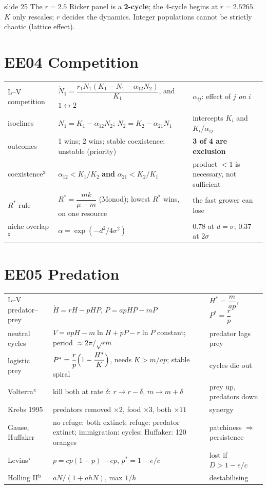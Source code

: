 \documentclass[9pt]{article}
\begin{document}
\begin{verifybox}{slide 25}
The $r=2.5$ Ricker panel is a \textbf{2-cycle}; the 4-cycle begins at $r=2.5265$. $K$ only rescales; $r$ decides the dynamics. Integer populations cannot be strictly chaotic (lattice effect).
\end{verifybox}

\section*{EE04 Competition}
\begin{tabular}{@{}p{2.6cm}p{8.2cm}p{6.6cm}@{}}
\toprule
L--V competition & $\dot N_1=\dfrac{r_1N_1(K_1-N_1-\alpha_{12}N_2)}{K_1}$, and $1\leftrightarrow2$ & $\alpha_{ij}$: effect of $j$ \emph{on} $i$\\
isoclines & $N_1=K_1-\alpha_{12}N_2$; \quad $N_2=K_2-\alpha_{21}N_1$ & intercepts $K_i$ and $K_i/\alpha_{ij}$\\
outcomes & 1 wins; 2 wins; stable coexistence; unstable (priority) & \textbf{3 of 4 are exclusion}\\
coexistence$^{\text{x}}$ & $\alpha_{12}<K_1/K_2$ \textbf{and} $\alpha_{21}<K_2/K_1$ & product $<1$ is necessary, not sufficient\\
$R^*$ rule & $R^*=\dfrac{mk}{\mu-m}$ (Monod); lowest $R^*$ wins, on one resource & the fast grower can lose\\
niche overlap$^{\text{x}}$ & $\alpha=\exp(-d^2/4\sigma^2)$ & $0.78$ at $d=\sigma$; $0.37$ at $2\sigma$\\
\bottomrule
\end{tabular}

\section*{EE05 Predation}
\begin{tabular}{@{}p{2.6cm}p{8.2cm}p{6.6cm}@{}}
\toprule
L--V predator--prey & $\dot H=rH-pHP$, \quad $\dot P=apHP-mP$ & $H^*=\dfrac{m}{ap}$, \quad $P^*=\dfrac rp$\\
neutral cycles & $V=apH-m\ln H+pP-r\ln P$ constant; period $\approx2\pi/\sqrt{rm}$ & predator lags prey\\
logistic prey & $P^*=\dfrac rp\Bigl(1-\dfrac{H^*}{K}\Bigr)$, needs $K>m/ap$; stable spiral & cycles die out\\
Volterra$^{\text{x}}$ & kill both at rate $\delta$: $r\to r-\delta$, $m\to m+\delta$ & prey up, predators down\\
Krebs 1995 & predators removed $\times2$, food $\times3$, both $\times11$ & synergy\\
Gause, Huffaker & no refuge: both extinct; refuge: predator extinct; immigration: cycles; Huffaker: 120 oranges & patchiness $\Rightarrow$ persistence\\
Levins$^{\text{x}}$ & $\dot p=cp(1-p)-ep$, \quad $p^*=1-e/c$ & lost if $D>1-e/c$\\
Holling II$^{\text{b}}$ & $aN/(1+ahN)$, max $1/h$ & destabilising\\
\bottomrule
\end{tabular}
\end{document}
